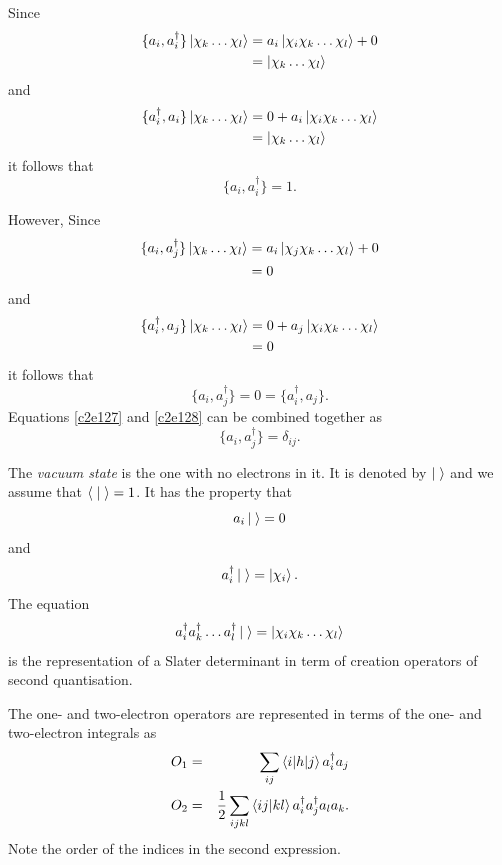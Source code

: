 Since
\[
\begin{aligned}
\{a_i,a_i^\dagger\}\ket{\chi_k\ldots\chi_l}&=a_i\ket{\chi_i\chi_k\ldots\chi_l}+0\\
 &=\ket{\chi_k\ldots\chi_l}
\end{aligned}
\]
and
\[
\begin{aligned}
\{a_i^\dagger, a_i\}\ket{\chi_k\ldots\chi_l}&=0+a_i\ket{\chi_i\chi_k\ldots\chi_l}\\
 &=\ket{\chi_k\ldots\chi_l}
\end{aligned}
\]
it follows that
\begin{equation}\label{c2e127}
\{a_i, a_i^\dagger\} = 1.
\end{equation}

However,
Since
\[
\begin{aligned}
\{a_i,a_j^\dagger\}\ket{\chi_k\ldots\chi_l}&=a_i\ket{\chi_j\chi_k\ldots\chi_l}+0\\
 &=0
\end{aligned}
\]
and
\[
\begin{aligned}
\{a_i^\dagger, a_j\}\ket{\chi_k\ldots\chi_l}&=0+a_j\ket{\chi_i\chi_k\ldots\chi_l}\\
 &=0
\end{aligned}
\]
it follows that
\begin{equation}\label{c2e128}
\{a_i, a_j^\dagger\} = 0 = \{a_i^\dagger, a_j\}.
\end{equation}
Equations \eqref{c2e127} and \eqref{c2e128} can be combined together as
\begin{equation}\label{c2e129}
\{a_i, a_j^\dagger\} = \delta_{ij}.
\end{equation}

The \emph{vacuum state} is the one with no electrons in it. It is denoted by
$\ket{\;}$ and we assume that $\braket{\;|\;} = 1$. It has the property that 
\begin{equation}\label{c2e130}
a_i\ket{\;} = 0
\end{equation}
and
\begin{equation}\label{c2e131}
a_i^\dagger\ket{\;} = \ket{\chi_i}.
\end{equation}
The equation
\begin{equation}\label{c2e132}
a_i^\dagger a_k^\dagger \ldots a_l^\dagger\ket{\;} = 
\ket{\chi_i\chi_k\ldots\chi_l}
\end{equation}
is the representation of a Slater determinant in term of creation operators of
second quantisation.

The one- and two-electron operators are represented in terms of the one- and
two-electron integrals as
\begin{eqnarray}
O_1 &=& \sum_{ij}\braket{i|h|j}a_i^\dagger a_j \label{c2e133} \\
O_2 &=& \frac{1}{2}\sum_{ijkl}\braket{ij|kl}a_i^\dagger a_j^\dagger a_la_k.
\label{c2e134}
\end{eqnarray}
Note the order of the indices in the second expression.

